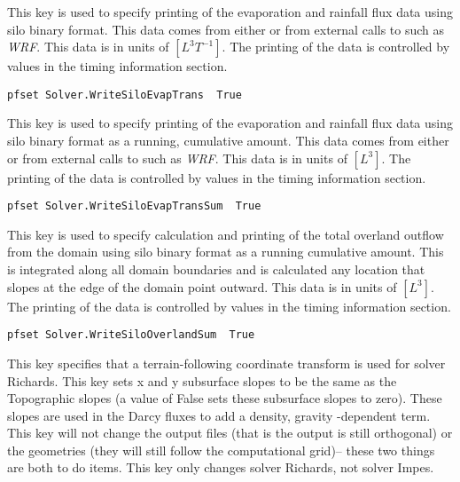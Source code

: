 {
This key is used to specify printing of the evaporation and rainfall flux data using silo binary format.  This data comes from either  or from external calls to \parflow{} such as \emph{WRF}.  This data is in units of $[L^3 T^{-1}]$.
The printing of the data is controlled by values in the
timing information section.  
}
\begin{display}\begin{verbatim}
pfset Solver.WriteSiloEvapTrans  True
\end{verbatim}\end{display}

{
This key is used to specify printing of the evaporation and rainfall flux data using silo binary format as a running, cumulative amount.  This data comes from either  or from external calls to \parflow{} such as \emph{WRF}.  This data is in units of $[L^3]$.
The printing of the data is controlled by values in the
timing information section.  
}
\begin{display}\begin{verbatim}
pfset Solver.WriteSiloEvapTransSum  True
\end{verbatim}\end{display}

{
This key is used to specify calculation and printing of the total overland outflow from the domain using silo binary format as a running cumulative amount.   This is integrated along all domain boundaries and is calculated any location that slopes at the edge of the domain point outward. This data is in units of $[L^3]$.
The printing of the data is controlled by values in the
timing information section.  
}
\begin{display}\begin{verbatim}
pfset Solver.WriteSiloOverlandSum  True
\end{verbatim}\end{display}

{
This key specifies that a terrain-following coordinate transform is used for solver Richards. This key sets x and y subsurface slopes to be the same as the Topographic slopes (a value of False sets these subsurface slopes to zero).
These slopes are used in the Darcy fluxes to add a density, gravity -dependent term.  This key will not change the output files (that is the output is still orthogonal) or the geometries (they will still follow the computational grid)-- these two things are both to do items.  This key only changes solver Richards, not solver Impes. 
}


